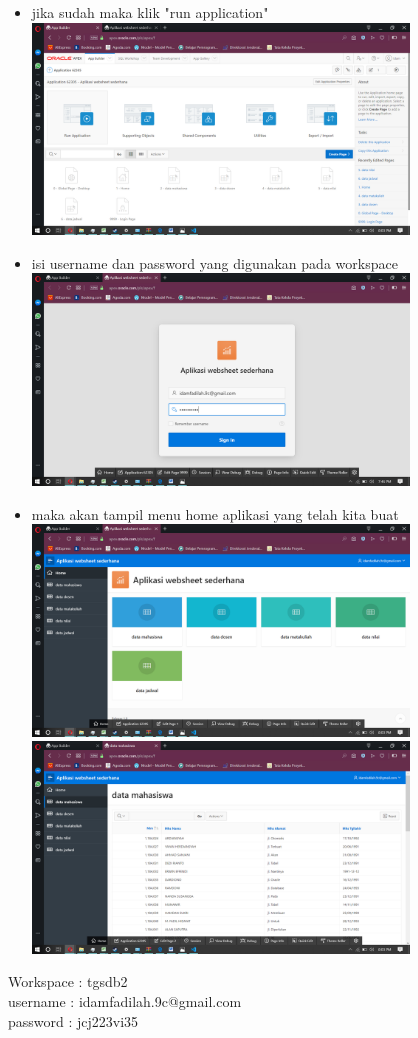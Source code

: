 \documentclass[a4paper,12pt]{report}
\begin{document}
\begin{itemize}
	\item jika sudah maka klik "run application"\\
	\includegraphics[width=10cm]{aplikasi websheet/Screenshot (163).png}\\ 
	\item isi username dan password yang digunakan pada workspace\\
	\includegraphics[width=10cm]{aplikasi websheet/Screenshot (164).png}\\ 
	\item maka akan tampil menu home aplikasi yang telah kita buat\\
	\includegraphics[width=10cm]{aplikasi websheet/Screenshot (169).png}\\ 
\includegraphics[width=10cm]{aplikasi websheet/Screenshot (170).png}\\
	

\end{itemize}
Workspace : tgsdb2\\
username  : idamfadilah.9c@gmail.com\\
password  : jcj223vi35\\
\end{document}
